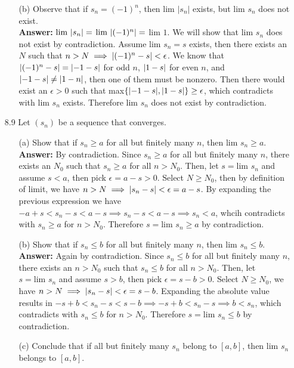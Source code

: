 \documentclass{article}
\begin{document}
\begin{itemize}
\begin{itemize}
\begin{itemize}
                        \end{itemize}
                  \item [(b)] Observe that if $s_n=(-1)^n$, then $\text{lim }|s_n|$ exists, but $\text{lim }s_n$ does not exist.\\
                        \textbf{Answer: } $\text{lim }\abs{s_n}=$ $\text{lim }\abs{(-1)^n}=$ $\text{lim }1$. We will show that $\text{lim }s_n$ does not exist by contradiction. Assume $\text{lim }s_n=s$ exists, then there exists an $N$ such that $n>N\implies\abs{(-1)^n-s}<\epsilon$. We know that $\abs{(-1)^n-s}=\abs{-1-s}$ for odd $n$, $\abs{1-s}$ for even $n$, and $\abs{-1-s}\neq\abs{1-n}$, then one of them must be nonzero. Then there would exist an $\epsilon>0$ such that max$\{\abs{-1-s},\abs{1-s}\}\geq\epsilon$, which contradicts with $\text{lim }s_n$ exists. Therefore $\text{lim }s_n$ does not exist by contradiction.
            \end{itemize}
      \item [8.9] Let $(s_n)$ be a sequence that converges.
            \begin{itemize}
                  \item [(a)] Show that if $s_n\geq a$ for all but finitely many $n$, then $\text{lim }s_n\geq a$.\\
                        \textbf{Answer: } By contradiction. Since $s_n\geq a$ for all but finitely many $n$, there exists an $N_0$ such that $s_n\geq a$ for all $n>N_0$. Then, let $s=\text{lim }s_n$ and assume $s<a$, then pick $\epsilon=a-s>0$. Select $N\geq N_0$, then by definition of limit, we have $n>N\implies\abs{s_n-s}<\epsilon=a-s$. By expanding the previous expression we have $-a+s<s_n-s<a-s\implies s_n-s<a-s\implies s_n<a$, whcih contradicts with $s_n\geq a$ for $n>N_0$. Therefore $s=\text{lim }s_n\geq a$ by contradiction.
                  \item [(b)] Show that if $s_n\leq b$ for all but finitely many $n$, then $\text{lim }s_n\leq b$.\\
                        \textbf{Answer: } Again by contradiction. Since $s_n\leq b$ for all but finitely many $n$, there exists an $n>N_0$ such that $s_n\leq b$ for all $n>N_0$. Then, let $s=\text{lim }s_n$ and assume $s>b$, then pick $\epsilon=s-b>0$. Select $N\geq N_0$, we have $n>N\implies\abs{s_n-s}<\epsilon=s-b$. Expanding the absolute value results in $-s+b<s_n-s<s-b\implies -s+b<s_n-s\implies b<s_n$, which contradicts with $s_n\leq b$ for $n>N_0$. Therefore $s=\text{lim }s_n\leq b$ by contradiction.
                  \item [(c)] Conclude that if all but finitely many $s_n$ belong to $[a,b]$, then $\text{lim }s_n$ belongs to $[a,b]$.\\

\end{itemize}
\end{itemize}
\end{document}
